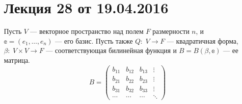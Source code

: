 


\renewcommand{\f}{\mathbb{f}}

\section{Лекция 28 от 19.04.2016}

Пусть $V$ --- векторное пространство над полем $F$ размерности $n$, и $\mathbb{e} = (e_1, \ldots, e_n)$ --- его базис. Пусть также $Q\colon \; V \to F$ --- квадратичная форма, $\beta\colon\; V\times V \to F$ --- соответствующая билинейная функция и $B = B(\beta, \mathbb{e})$ --- ее матрица.
$$
B = \begin{pmatrix}
	b_{11}& b_{12} & b_{13} & \vdots\\
	b_{21}& b_{22} & b_{23} & \vdots\\
	b_{31}& b_{32}& b_{33} & \vdots\\
	\cdots& \cdots& \cdots& \ddots
\end{pmatrix}
$$

